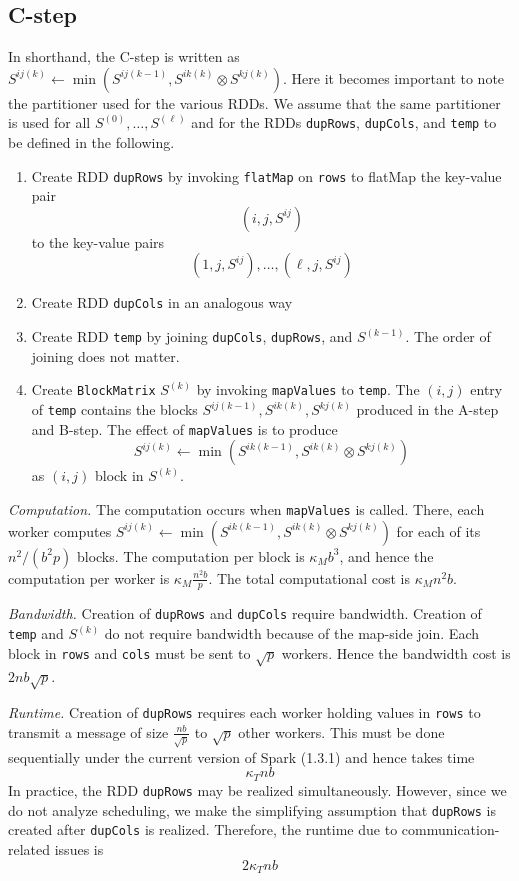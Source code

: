 \documentclass{article} %
\begin{document}
\subsection{C-step}

In shorthand, the C-step is written as $S^{ij(k)} \leftarrow \min(S^{ij(k-1)}, S^{ik(k)} \otimes S^{kj(k)})$.
Here it becomes important to note the partitioner used for the various RDDs.
We assume that the same partitioner is used for all $S^{(0)}, \hdots, S^{(\ell)}$
and for the RDDs {\tt dupRows}, {\tt dupCols}, and {\tt temp} to be defined in the following.

\begin{enumerate}
\item Create RDD {\tt dupRows} by invoking {\tt flatMap} on {\tt rows} to flatMap the key-value pair
\[
(i, j, S^{ij})
\]
to the key-value pairs
\[
(1, j, S^{ij}), \hdots, (\ell, j, S^{ij})
\]
\item Create RDD {\tt dupCols} in an analogous way
\item Create RDD {\tt temp} by joining {\tt dupCols}, {\tt dupRows},
  and $S^{(k-1)}$.  The order of joining does not matter.
\item Create {\tt BlockMatrix} $S^{(k)}$ by invoking {\tt mapValues}
  to {\tt temp}.  The $(i, j)$ entry of {\tt temp} contains the blocks
  $S^{ij(k-1)}, S^{ik(k)}, S^{kj(k)}$ produced in the A-step and
  B-step.  The effect of {\tt mapValues} is to produce
\[
S^{ij(k)} \leftarrow \min(S^{ik(k-1)}, S^{ik(k)} \otimes S^{kj(k)})
\]
as $(i, j)$ block in $S^{(k)}$.
\end{enumerate}

\emph{Computation.}  The computation occurs when {\tt mapValues} is
called.  There, each worker computes $S^{ij(k)} \leftarrow
\min(S^{ik(k-1)}, S^{ik(k)} \otimes S^{kj(k)})$ for each of its
$n^2/(b^2 p)$ blocks.  The computation per block is $\kappa_M b^3$, and
hence the computation per worker is $\kappa_M \frac{n^2b}{p}$.
The total computational cost is $\kappa_M n^2b$.

\emph{Bandwidth.} Creation of {\tt dupRows} and {\tt dupCols} require
bandwidth.  Creation of {\tt temp} and $S^{(k)}$ do not require
bandwidth because of the map-side join.  Each block in {\tt rows} and
{\tt cols} must be sent to $\sqrt{p}$ workers.
Hence the bandwidth cost is $2 n b \sqrt{p}$.

\emph{Runtime.}  Creation of {\tt dupRows} requires each worker
holding values in {\tt rows} to transmit a message of size
$\frac{nb}{\sqrt{p}}$ to $\sqrt{p}$ other workers.  This must be done
sequentially under the current version of Spark (1.3.1) and hence
takes time
\[
\kappa_T nb
\]
In practice, the RDD {\tt dupRows} may be realized simultaneously.
However, since we do not analyze scheduling, we make the simplifying
assumption that {\tt dupRows} is created after {\tt dupCols} is
realized.
Therefore, the runtime due to communication-related issues is
\[
2\kappa_T nb
\]
\end{document}

